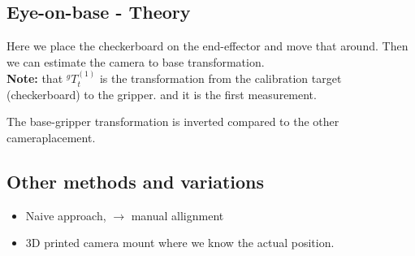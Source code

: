 \documentclass[a4paper]{article}
\begin{document}
\subsection{Eye-on-base - Theory}
Here we place the checkerboard on the end-effector and move that around. Then we can estimate the camera to base transformation. \\
\textbf{Note:} that $ ^{g}T_t^{(1)} $  is the transformation from the calibration target (checkerboard) to the gripper. and it is the first measurement.

The base-gripper transformation is inverted compared to the other cameraplacement. 

\subsection{Other methods and variations}
\begin{itemize}
	\item Naive approach, $ \rightarrow  $ manual allignment 
	\item 3D printed camera mount where we know the actual position.
\end{itemize}
\end{document}

